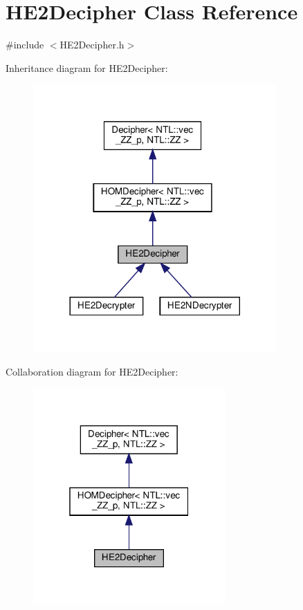 \hypertarget{classHE2Decipher}{}\section{H\+E2\+Decipher Class Reference}
\label{classHE2Decipher}


{\ttfamily \#include $<$H\+E2\+Decipher.\+h$>$}



Inheritance diagram for H\+E2\+Decipher\+:
\nopagebreak
\begin{figure}[H]
\begin{center}
\leavevmode
\includegraphics[width=264pt]{classHE2Decipher__inherit__graph}
\end{center}
\end{figure}


Collaboration diagram for H\+E2\+Decipher\+:
\nopagebreak
\begin{figure}[H]
\begin{center}
\leavevmode
\includegraphics[width=208pt]{classHE2Decipher__coll__graph}
\end{center}
\end{figure}
